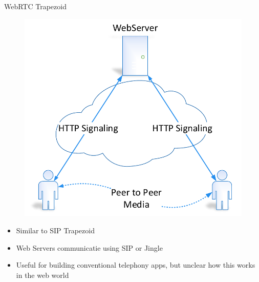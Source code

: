 \begin{frame}{WebRTC Trapezoid}
\begin{figure}
\includegraphics[page=4,width=.6\textwidth]{image/webrtc.pdf}
\end{figure}
\begin{itemize}
\item Similar to SIP Trapezoid
\item Web Servers communicatie using SIP or Jingle
\item Useful for building conventional telephony apps, but unclear how this works in the web world
\end{itemize}
\end{frame}


